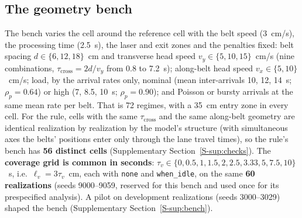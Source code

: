 \documentclass[11pt,a4paper]{article}
\newcommand{\nj}{\textsc{nj}}
\newcommand{\tcross}{\tau_{\mathrm{cross}}}
\newcommand{\tv}{\tau_{v}}
\newcommand{\lv}{\ell_{v}}
\newcommand{\supsec}[1]{Supplementary Section~\ref{S-#1}}
\begin{document}
\begin{table}[t]
\centering\small
\caption{Reference-cell regimes and physical scales. $\tcross$ is the head's travel time
across the conveyors; the entry zone is given in seconds of belt travel; parts, penalized
flow time, blocking events and blocked conveyor-seconds are means per episode for \nj\ in
B over the 30 realizations (seeds 7000--7029, shared with the companion paper).}
\label{tab:regimes}
\resizebox{\linewidth}{!}{}
\end{table}

\subsection{The geometry bench}\label{sec:bench}
The bench varies the cell around the reference cell with the belt speed (3~cm/s), the
processing time (2.5~s), the laser and exit zones and the penalties fixed: belt spacing
$d\in\{6,12,18\}$~cm and transverse head speed $v_y\in\{5,10,15\}$~cm/s (nine
combinations, $\tcross=2d/v_y$ from 0.8 to 7.2~s); along-belt head speed
$v_x\in\{5,10\}$~cm/s; load, by the arrival rates only, nominal (mean inter-arrivals 10, 12,
14~s; $\rho_p=0.64$) or high (7, 8.5, 10~s; $\rho_p=0.90$); and Poisson or bursty arrivals
at the same mean rate per belt. That is 72 regimes, with a 35~cm entry zone in every cell.
For the rule, cells with the same $\tcross$ and the same along-belt geometry are identical
realization by realization by the model's structure (with simultaneous axes the belts'
positions enter only through the lane travel times), so the rule's bench has \textbf{56
distinct cells} (\supsec{sup:checks}). The \textbf{coverage grid is common in seconds}:
$\tv\in\{0,0.5,1,1.5,2,2.5,3.33,5,7.5,10\}$~s, i.e.\ $\lv=3\tv$~cm, each with \texttt{none}
and \texttt{when\_idle}, on the same \textbf{60 realizations} (seeds 9000--9059, reserved
for this bench and used once for its prespecified analysis). A pilot on development
realizations (seeds 3000--3029) shaped the bench (\supsec{sup:bench}).
\end{document}

